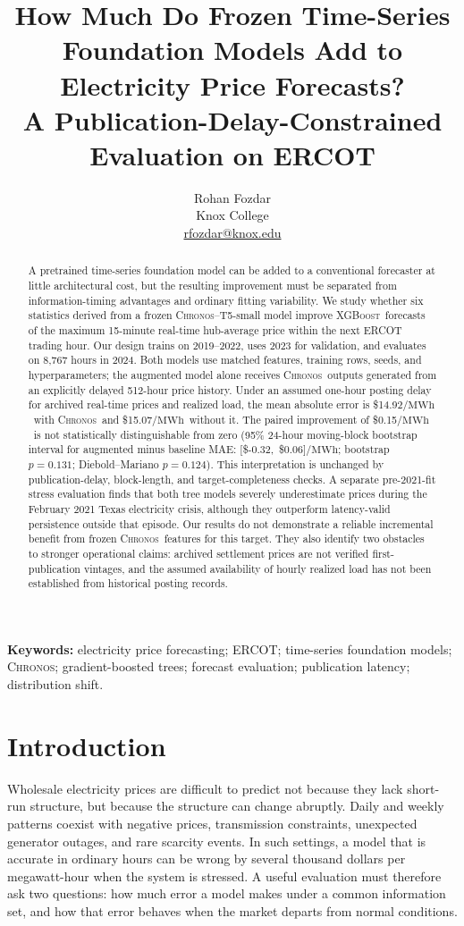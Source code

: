 \documentclass[11pt,letterpaper]{article}
\title{\bfseries How Much Do Frozen Time-Series Foundation Models Add to Electricity Price Forecasts?\\[0.25em]
\large A Publication-Delay-Constrained Evaluation on ERCOT}
\author{Rohan Fozdar\\[-0.1em]\normalsize Knox College\\[-0.1em]\normalsize \href{mailto:rfozdar@knox.edu}{rfozdar@knox.edu}}
\date{}
\newcommand{\MWh}{\ensuremath{\mathrm{MWh}}}
\newcommand{\Chronos}{\textsc{Chronos}}
\newcommand{\XGB}{\textsc{XGBoost}}
\begin{document}
\maketitle
\begin{abstract}
A pretrained time-series foundation model can be added to a conventional forecaster at little architectural cost, but the resulting improvement must be separated from information-timing advantages and ordinary fitting variability. We study whether six statistics derived from a frozen \Chronos--T5-small model improve \XGB\ forecasts of the maximum 15-minute real-time hub-average price within the next ERCOT trading hour. Our design trains on 2019--2022, uses 2023 for validation, and evaluates on 8,767 hours in 2024. Both models use matched features, training rows, seeds, and hyperparameters; the augmented model alone receives \Chronos\ outputs generated from an explicitly delayed 512-hour price history. Under an assumed one-hour posting delay for archived real-time prices and realized load, the mean absolute error  is \$14.92/\MWh\ with \Chronos\ and \$15.07/\MWh\ without it. The paired improvement of \$0.15/\MWh\ is not statistically distinguishable from zero (95\% 24-hour moving-block bootstrap interval for augmented minus baseline MAE: [\$-0.32,\ \$0.06]/\MWh; bootstrap $p=0.131$; Diebold--Mariano $p=0.124$). This interpretation is unchanged by publication-delay, block-length, and target-completeness checks. A separate pre-2021-fit stress evaluation finds that both tree models severely underestimate prices during the February 2021 Texas electricity crisis, although they outperform latency-valid persistence outside that episode. Our results do not demonstrate a reliable incremental benefit from frozen \Chronos\ features for this target. They also identify two obstacles to stronger operational claims: archived settlement prices are not verified first-publication vintages, and the assumed availability of hourly realized load has not been established from historical posting records.
\end{abstract}

\noindent\textbf{Keywords:} electricity price forecasting; ERCOT; time-series foundation models; \Chronos; gradient-boosted trees; forecast evaluation; publication latency; distribution shift.

\section{Introduction}\label{sec:intro}
Wholesale electricity prices are difficult to predict not because they lack short-run structure, but because the structure can change abruptly. Daily and weekly patterns coexist with negative prices, transmission constraints, unexpected generator outages, and rare scarcity events. In such settings, a model that is accurate in ordinary hours can be wrong by several thousand dollars per megawatt-hour when the system is stressed. A useful evaluation must therefore ask two questions: how much error a model makes under a common information set, and how that error behaves when the market departs from normal conditions.
\end{document}
